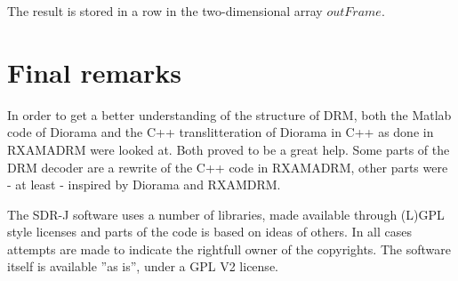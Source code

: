 \documentclass[11pt]{article}
\begin{document}
The result is stored in a row in the two-dimensional array $outFrame$.

\section{Final remarks}
In order to get a better understanding of the structure of DRM,
both the Matlab code of
Diorama\cite{Diorama} and the C++ translitteration of Diorama in C++
as done in RXAMADRM \cite{Bos}
were looked at. Both proved to be a great help.
Some parts of the DRM decoder
are a rewrite of the C++ code in  RXAMADRM, other parts were
- at least - inspired by Diorama and RXAMDRM.

The SDR-J software uses a number of libraries, made available
through (L)GPL style licenses and parts of the code is
based on ideas of others.
In all cases attempts are made to indicate the rightfull
owner of the copyrights. The software itself is available ”as is”,
under a GPL V2 license.
\end{document}
